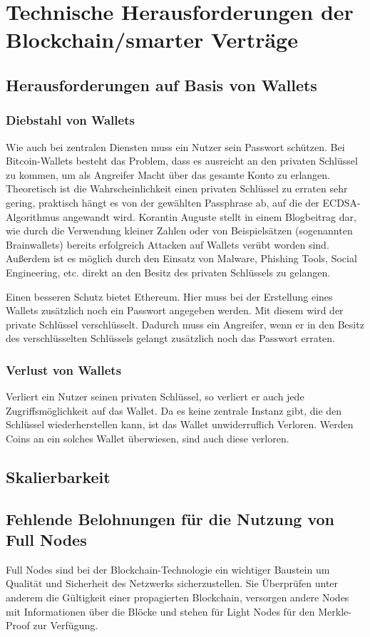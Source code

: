 \chapter{Technische Herausforderungen der Blockchain/smarter Verträge}
\section{Herausforderungen auf Basis von Wallets}
\subsection{Diebstahl von Wallets}
Wie auch bei zentralen Diensten muss ein Nutzer sein Passwort schützen. Bei Bitcoin-Wallets besteht das Problem, dass es ausreicht an den privaten Schlüssel zu kommen, um als Angreifer Macht über das gesamte Konto zu erlangen. Theoretisch ist die Wahrscheinlichkeit einen privaten Schlüssel zu erraten sehr gering, praktisch hängt es von der gewählten Passphrase ab, auf die der ECDSA-Algorithmus angewandt wird. Korantin Auguste stellt in einem Blogbeitrag dar, wie durch die Verwendung kleiner Zahlen oder von Beispielsätzen (sogenannten Brainwallets) bereits erfolgreich Attacken auf Wallets verübt worden sind. \\
Außerdem ist es möglich durch den Einsatz von Malware, Phishing Tools, Social Engineering, etc. direkt an den Besitz des privaten Schlüssels zu gelangen.

Einen besseren Schutz bietet Ethereum. Hier muss bei der Erstellung eines Wallets zusätzlich noch ein Passwort angegeben werden. Mit diesem wird der private Schlüssel verschlüsselt. Dadurch muss ein Angreifer, wenn er in den Besitz des verschlüsselten Schlüssels gelangt zusätzlich noch das Passwort erraten.

\subsection{Verlust von Wallets}
Verliert ein Nutzer seinen privaten Schlüssel, so verliert er auch jede Zugriffsmöglichkeit auf das Wallet. Da es keine zentrale Instanz gibt, die den Schlüssel wiederherstellen kann, ist das Wallet unwiderruflich Verloren. Werden Coins an ein solches Wallet überwiesen, sind auch diese verloren.
\section{Skalierbarkeit}
\section{Fehlende Belohnungen für die Nutzung von Full Nodes}
Full Nodes sind bei der Blockchain-Technologie ein wichtiger Baustein um Qualität und Sicherheit des Netzwerks sicherzustellen. Sie Überprüfen unter anderem die Gültigkeit einer propagierten Blockchain, versorgen andere Nodes mit Informationen über die Blöcke und stehen für Light Nodes für den Merkle-Proof zur Verfügung.

